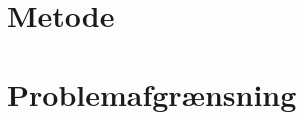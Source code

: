 

\raggedbottom




%
%
%
%
%
%
%
%
%
%
%
\chapter{Metode}\vspace{-.75cm}

%
%
%
%
%
%
\chapter{Problemafgrænsning}\vspace{-.75cm}


